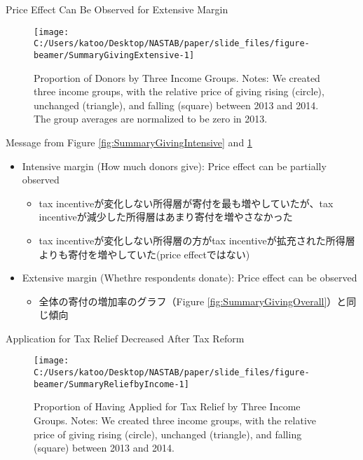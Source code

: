 \documentclass[
  ignorenonframetext,
  aspectratio=169,
]{beamer}
\providecommand{\tightlist}{%
  \setlength{\itemsep}{0pt}\setlength{\parskip}{0pt}}
\begin{document}
\begin{frame}{Price Effect Can Be Observed for Extensive Margin}
\protect\hypertarget{price-effect-can-be-observed-for-extensive-margin}{}
\begin{figure}[t]

{\centering \texttt{[image: C:/Users/katoo/Desktop/NASTAB/paper/slide\_files/figure-beamer/SummaryGivingExtensive-1]} 

}

\caption{Proportion of Donors by Three Income Groups. Notes: We created three income groups, with the relative price of giving rising (circle), unchanged (triangle), and falling (square) between 2013 and 2014. The group averages are normalized to be zero in 2013.}\label{fig:SummaryGivingExtensive}
\end{figure}
\end{frame}

\begin{frame}{Message from Figure \ref{fig:SummaryGivingIntensive} and \ref{fig:SummaryGivingExtensive}}
\protect\hypertarget{message-from-figure-reffigsummarygivingintensive-and-reffigsummarygivingextensive}{}
\begin{itemize}
\tightlist
\item
  Intensive margin (How much donors give): Price effect can be partially observed

  \begin{itemize}
  \tightlist
  \item
    tax incentiveが変化しない所得層が寄付を最も増やしていたが、tax incentiveが減少した所得層はあまり寄付を増やさなかった
  \item
    tax incentiveが変化しない所得層の方がtax incentiveが拡充された所得層よりも寄付を増やしていた(price effectではない)
  \end{itemize}
\item
  Extensive margin (Whethre respondents donate): Price effect can be observed

  \begin{itemize}
  \tightlist
  \item
    全体の寄付の増加率のグラフ（Figure \ref{fig:SummaryGivingOverall}）と同じ傾向
  \end{itemize}
\end{itemize}
\end{frame}

\begin{frame}{Application for Tax Relief Decreased After Tax Reform}
\protect\hypertarget{application-for-tax-relief-decreased-after-tax-reform}{}
\begin{figure}[t]

{\centering \texttt{[image: C:/Users/katoo/Desktop/NASTAB/paper/slide\_files/figure-beamer/SummaryReliefbyIncome-1]} 

}

\caption{Proportion of Having Applied for Tax Relief by Three Income Groups. Notes: We created three income groups, with the relative price of giving rising (circle), unchanged (triangle), and falling (square) between 2013 and 2014.}\label{fig:SummaryReliefbyIncome}
\end{figure}
\end{frame}
\end{document}
